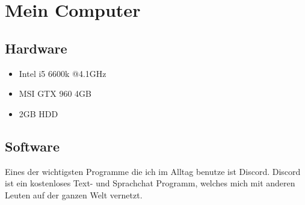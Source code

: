 \section{Mein Computer}
\subsection{Hardware}
\begin{itemize}
\item Intel i5 6600k @4.1GHz
\item MSI GTX 960 4GB
\item 2GB HDD
\end{itemize}
\subsection{Software}
Eines der wichtigsten Programme die ich im Alltag benutze ist Discord.
Discord ist ein kostenloses Text- und Sprachchat Programm, welches mich mit anderen Leuten auf der ganzen Welt vernetzt.